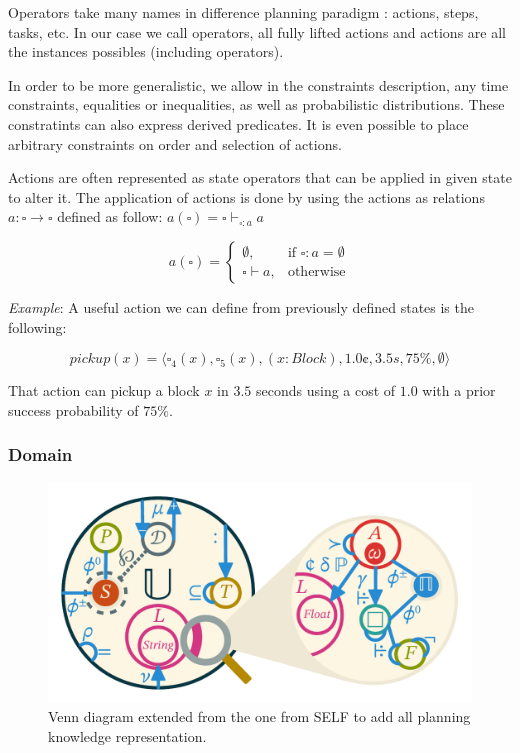 \documentclass[11pt,a4paper,twoside,openright,titlepage,numbers=noenddot,headinclude,cleardoublepage=empty,openany]{scrreprt}
\theoremstyle{plain}
\theoremstyle{definition}
\theoremstyle{remark}
\begin{document}
Operators take many names in difference planning paradigm : actions,
steps, tasks, etc. In our case we call operators, all fully lifted
actions and actions are all the instances possibles (including
operators).

In order to be more generalistic, we allow in the constraints
description, any time constraints, equalities or inequalities, as well
as probabilistic distributions. These constratints can also express
derived predicates. It is even possible to place arbitrary constraints
on order and selection of actions.

Actions are often represented as state operators that can be applied in
given state to alter it. The application of actions is done by using the
actions as relations \(a : \square \to \square\) defined as follow:
\(a(\smwhtsquare) = \smwhtsquare \vdash_{\smwhtsquare : a} a\)

\[a(\smwhtsquare) = 
\begin{cases}
  \emptyset,& \text{if } \smwhtsquare : a =\emptyset\\
  \smwhtsquare \vdash a,& \text{otherwise}
\end{cases}\]

\emph{Example}: A useful action we can define from previously defined
states is the following:

\[pickup(x) = \langle \smwhtsquare_4(x), \smwhtsquare_5(x), (x: Block), 1.0¢, 3.5s, 75\%, \emptyset \rangle\]

That action can pickup a block \(x\) in \(3.5\) seconds using a cost of
\(1.0\) with a prior success probability of \(75\%\).

\hypertarget{domain}{%
\subsubsection{Domain}\label{domain}}

\begin{figure}
\hypertarget{fig:color}{%
\centering
\includegraphics{./tex2pdf.-0b80fea6fd6da7f9/06944a42aedb12e635d620452c21055727f7b931.pdf}
\caption{Venn diagram extended from the one from SELF to add all
planning knowledge representation.}\label{fig:color}
}
\end{figure}
\end{document}
